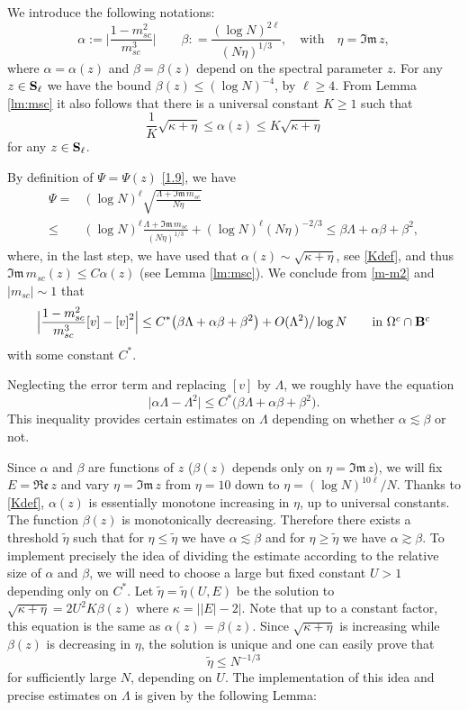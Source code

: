\documentclass[draft]{article}
\newcommand{\wt}{\widetilde}
\newcommand{\non}{\nonumber}
\newcommand{\al}{\alpha}
\newcommand{\be}{\begin{equation}}
\newcommand{\ee}{\end{equation}}
\newcommand{\barv}{ {[ v ]}}
\newcommand{\re}{{\mathfrak{Re} \, }}
\newcommand{\im}{{\mathfrak{Im} \, }}
\newcommand{\bS}{ {\bf  S}}
\numberwithin{equation}{section}
\numberwithin{theorem}{section}
\numberwithin{definition}{section}
\numberwithin{remark}{section}
\begin{document}
We introduce the following notations:
\be\label{58}
 \alpha  := \Big|\frac { 1-m^2_{sc}}{m_{sc}^{3}}\Big|
\qquad  \beta : =  \frac{ (\log N)^{2 \ell} }{ (N \eta)^{1/3}}, \quad
\mbox{with}\quad \eta =\im z, 
\ee
where $\al=\al(z)$ and $ \beta= \beta(z)$ depend on the spectral parameter $z$.
For
 any $z\in \bS_\ell$ we have the bound 
$\beta(z) \le (\log N)^{-4}$,
by $\ell \ge 4$.
{F}rom Lemma \ref{lm:msc} it also follows that there is a universal
constant $K\ge1$ such that
\be
   \frac{1}{K}\sqrt{\kappa+\eta}\le  \alpha(z)\le K\sqrt{\kappa+\eta}
\label{Kdef}
\ee
for any $z\in \bS_\ell$. 


By definition of  $\Psi=\Psi(z)$ \eqref{1.9}, we have 
\begin{align}
    \Psi = &    (\log N)^\ell   \sqrt{\frac{\Lambda +\im m_{sc} }{N\eta}}    \non \\
\le &    (\log N)^\ell     {\frac{\Lambda +\im m_{sc} }{(N\eta)^{1/3}}} +    
 (\log N)^\ell    (N \eta)^{-2/3} \le \beta \Lambda + \alpha \beta + \beta^2, 
\end{align}
where, in the last step, we have
 used that  $\alpha(z) \sim \sqrt{\kappa+\eta}$, see \eqref{Kdef}, and thus
$ \im m_{sc}(z)   \le C \alpha(z)$ (see Lemma \ref{lm:msc}).
We conclude from \eqref{m-m2} and $|m_{sc}|\sim 1$ that
\be
  \Big| \frac{1-m^2_{sc}}{m_{sc}^3} \barv - \barv^2\Big|  \le
 C^*\big(\beta \Lambda + \alpha \beta + \beta^2\big) +
   O(\Lambda^2)/\log N \qquad \mbox{in $\Omega^c\cap {\bf B}^c$}
\label{dich}
\ee
with some  constant $C^*$.   

Neglecting the error term and replacing $\barv$ by $\Lambda$,  we roughly have the equation 
\be
 \Big| \alpha \Lambda  -\Lambda^2\Big|  \le
 C^*\big(\beta \Lambda + \alpha \beta + \beta^2\big).
\label{dichint}
\ee
This inequality provides certain estimates on $\Lambda$ depending on whether $\al \lesssim \beta$ or not.



Since $\alpha$ and $\beta$ are functions of $z$ ($\beta(z)$
depends only on $\eta=\im z$), 
we will fix  $E=\re z$ and vary $\eta=\im z$ from $\eta=10$ down
to $\eta = (\log N)^{10\ell}/N$. 
{ Thanks to \eqref{Kdef}, $\al(z)$ is essentially monotone increasing
in $\eta$, up to universal constants. The function $\beta(z)$ is monotonically
decreasing. Therefore there exists a threshold $\wt\eta$ such that
for $\eta\le\wt\eta$ we have $\alpha \lesssim \beta$
and for  $\eta\ge\wt\eta$ we have $\alpha \gtrsim \beta$.
To implement precisely the idea of dividing the estimate 
according to the relative size of $\alpha$ and  $\beta$, 
we will need to choose a large but fixed constant 
 $U>1$ depending only on $C^*$. Let $\wt\eta=\wt\eta(U, E)$ be the solution to 
$\sqrt{\kappa+\eta}= 2 U^2K \beta(z) $ where  $\kappa = \big| |E|-2\big|$.
Note that up to a constant factor, this equation is the
same as $\alpha(z)=\beta(z)$. } Since  $\sqrt{\kappa+\eta}$ is increasing
 while $\beta(z) $ is decreasing in $\eta$, 
the solution is unique and  one can easily prove that 
\be\label{teta}
\wt\eta \le N^{-1/3}
\ee
 for sufficiently large $N$,
depending on $U$. 
The   implementation of this idea and  precise estimates on $\Lambda$ is given by the following Lemma: 
\end{document}
